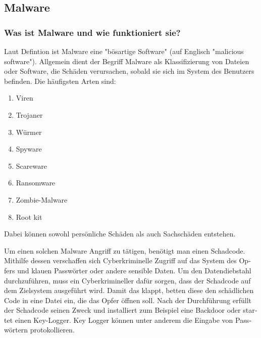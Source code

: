 \begin{otherlanguage}{ngerman}
\subsection{Malware}
\subsubsection{Was ist Malware und wie funktioniert sie?}

Laut Defintion ist Malware eine "bösartige Software"
(auf Englisch "malicious software").
\newline Allgemein dient der Begriff Malware als Klassifizierung von Dateien oder Software, die Schäden verursachen, sobald sie sich im System des Benutzers befinden. 
\newline Die häufigsten Arten sind:
\begin{enumerate}
    \item Viren
    \item Trojaner
    \item Würmer
    \item Spyware
    \item Scareware
    \item Ransomware
    \item Zombie-Malware
    \item Root kit
\end{enumerate}
Dabei können sowohl persönliche Schäden als auch Sachschäden entstehen.

Um einen solchen Malware Angriff zu tätigen, benötigt man einen Schadcode. 
\newline Mithilfe dessen verschaffen sich Cyberkriminelle Zugriff auf das System des Opfers und klauen Passwörter oder andere sensible Daten.
\newline Um den Datendiebstahl durchzuführen, muss ein Cyberkrimineller dafür sorgen, dass der Schadcode auf dem Zielsystem ausgeführt wird. 
\newline Damit das klappt, betten diese den schädlichen Code in eine Datei ein, die das Opfer öffnen soll. 
\newline Nach der Durchführung erfüllt der Schadcode seinen Zweck und installiert zum Beispiel eine Backdoor oder startet einen Key-Logger. Key Logger können unter anderem die Eingabe von Passwörtern protokollieren.


\end{otherlanguage}
